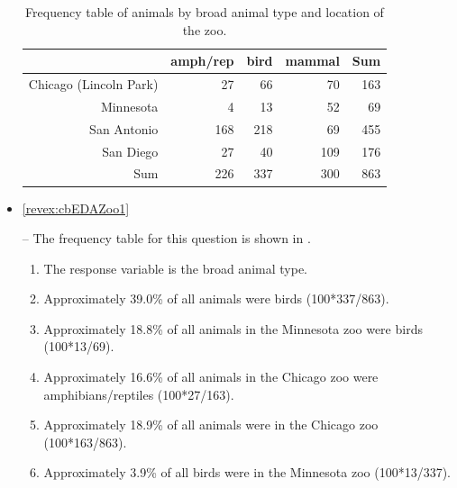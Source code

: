 \documentclass[10pt,openany]{book}\usepackage[]{graphicx}\usepackage[]{color}
\begin{document}
\begin{itemize}
\begin{table}[ht]
\centering
\caption{Frequency table of animals by broad animal type and location of the zoo.} 
\label{tab:Zoo1Freq}
\begin{tabular}{rrrrr}
  \hline
 & amph/rep & bird & mammal & Sum \\ 
  \hline
Chicago (Lincoln Park) & 27 & 66 & 70 & 163 \\ 
  Minnesota & 4 & 13 & 52 & 69 \\ 
  San Antonio & 168 & 218 & 69 & 455 \\ 
  San Diego & 27 & 40 & 109 & 176 \\ 
  Sum & 226 & 337 & 300 & 863 \\ 
   \hline
\end{tabular}
\end{table}

  \item \hypertarget{ans:cbEDAZoo1}{\ref{revex:cbEDAZoo1}} -- The frequency table for this question is shown in .
    \begin{enumerate}
      \item The response variable is the broad animal type.
      \item Approximately 39.0\% of all animals were birds (100*337/863).
      \item Approximately 18.8\% of all animals in the Minnesota zoo were birds (100*13/69).
      \item Approximately 16.6\% of all animals in the Chicago zoo were amphibians/reptiles (100*27/163).
      \item Approximately 18.9\% of all animals were in the Chicago zoo (100*163/863).
      \item Approximately 3.9\% of all birds were in the Minnesota zoo (100*13/337).
    \end{enumerate}
\end{itemize}




\end{document}
